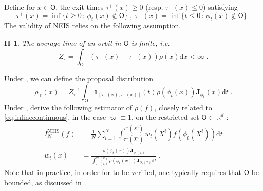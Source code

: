 \documentclass{article}
\newtheorem{assumption}{\textbf{H}\hspace{-3pt}}
\def\transfo{\operatorname{T}}
\def\rmd{\operatorname{d}\hspace{-2pt}}
\def\rset{\mathbb{R}}
\def\rmd{\mathrm{d}}
\def\eqsp{\,}
\def\ie{\textit{i.e.}}
\def\eqsp{\;}
\newcommand{\1}{\mathds{1}}
\newcommand{\indi}[1]{\1_{#1}}
\def\proposal{\rho}
\def\Jac{\mathbf{J}}
\newcommand{\JacOp}[1]{\Jac_{#1}}
\def\const{Z}
\def\mso{\mathsf{O}}
\def\rset{\mathbb{R}}
\def\rmd{\mathrm{d}}
\def\rhoT{\rho_{\transfo}}
\def\NEIS{\ensuremath{\operatorname{NEIS}}}
\begin{document}
Define for $x\in\mso$, the exit times
$\tau^+(x)\geq 0$ (resp. $\tau^-(x)\leq 0$) satisfying
\begin{equation}
 \label{eq:def_stopping_times}
    \tau^+(x) = \inf\{t\geq0 \, :\, \phi_t(x)\notin\mso\} \eqsp,\eqsp \tau^-(x) = \inf\{t\leq0 \, :\, \phi_t(x)\notin\mso\}\eqsp.
\end{equation}
The validity of NEIS relies on the following assumption.
\begin{assumption}
\label{assum:finite_constant}
The average time of an orbit in $\mso$ is finite, \ie\
\begin{equation}
    \label{eq:finite_const}
    \const_\tau = \int_\mso (\tau^+(x) - \tau^-(x))\proposal(x)\rmd x < \infty\eqsp.
\end{equation}
\end{assumption}
Under , we can define the proposal distribution
\begin{equation}
\label{eq:vde_proposal}
    \rhoT(x) = \const_\tau^{-1}\int_\mso \indi{[\tau^-(x),\tau^+(x)]}(t) \rho(\phi_t(x))\JacOp{\phi_t}(x)\rmd t\eqsp.
\end{equation}
Under , \citep[Equation (8)]{rotskoff:vanden-eijden:2019} derive the following estimator of $\rho(f)$, closely related to \eqref{eq:infinecontinuous}, in the case $\varpi\equiv 1$, on the restricted set $\mso\subset\rset^d$ :
\begin{align}
\label{eq:vde_estimator}
I^{\NEIS}_N(f) &= \frac{1}{N}\sum_ {i=1}^N \int_{\tau^-(X^i)}^{\tau^+(X^i)} w_t(X^i) f(\phi_t(X^i))\rmd t \\
w_t(x) &=   \frac{\rho(\phi_t(x))\JacOp{\phi_t(x)}}{\int_{\tau^-(x)}^{\tau^+(x)} \rho(\phi_t(x))\JacOp{\phi_t(x)} \rmd t}\eqsp.
\end{align}
Note that in practice, in order for  to be verified, one typically requires that $\mso$ be bounded, as discussed in \cite{rotskoff:vanden-eijden:2019}.  
\end{document}
